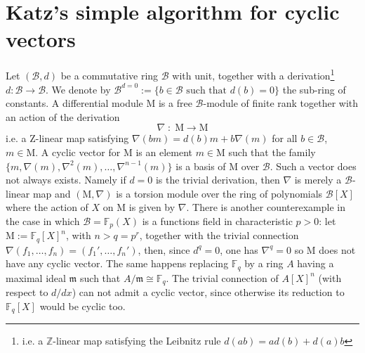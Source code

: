 \documentclass{compositio}
\numberwithin{equation}{section}
\begin{document}
\section{Katz's simple algorithm for cyclic vectors}
Let $({\mathscr{B}},d)$ be a commutative ring ${\mathscr{B}}$ with unit, together with a 
derivation\footnote{i.e. a $\mathbb{Z}$-linear map satisfying the Leibnitz rule $d(ab)=ad(b)+d(a)b$} 
$d:{\mathscr{B}}\to{\mathscr{B}}$.
We denote by ${\mathscr{B}}^{d=0}:=\{b\in{\mathscr{B}}\textrm{ such that }d(b)=0\}$ the sub-ring of constants.
A differential module ${\mathrm{M}}$ is a free ${\mathscr{B}}$-module of finite rank together with an action of the derivation 
\begin{equation}
\nabla\;:\;{\mathrm{M}}\to{\mathrm{M}}
\end{equation}
i.e. a $\mathrm{Z}$-linear map satisfying $\nabla(bm)=d(b)m+b\nabla(m)$ for all $b\in{\mathscr{B}}$, $m\in{\mathrm{M}}$. 
A cyclic vector for ${\mathrm{M}}$ is an element $m\in{\mathrm{M}}$ such that the family 
$\{ m,\nabla(m),\nabla^2(m),\ldots,\nabla^{n-1}(m)\}$ is a basis of ${\mathrm{M}}$ over ${\mathscr{B}}$. Such a vector does not always 
exists. Namely if $d=0$ is the trivial derivation, then $\nabla$ is merely a ${\mathscr{B}}$-linear map and $({\mathrm{M}},\nabla)$ is a 
torsion module over the ring of polynomials ${\mathscr{B}}[X]$ where the action of $X$ on ${\mathrm{M}}$ is given by $\nabla$. 
There is another counterexample in the case in which ${\mathscr{B}}=\mathbb{F}_p(X)$ is a
functions field in characteristic $p>0$: let ${\mathrm{M}}:=\mathbb{F}_q[X]^n$, with $n>q=p^r$, 
together with the trivial connection 
$\nabla(f_1,\ldots,f_n)=(f_1',\ldots,f_n')$, then, since $d^q=0$, one has $\nabla^q=0$ so ${\mathrm{M}}$ does not 
have any cyclic vector. The same happens replacing $\mathbb{F}_q$ by a ring $A$ having a maximal ideal $\mathfrak{m}$ 
such that $A/\mathfrak{m}\cong\mathbb{F}_q$. The trivial connection of $A[X]^n$ (with respect to $d/dx$) 
can not admit a cyclic vector, since otherwise its reduction to $\mathbb{F}_q[X]$ would be cyclic too.
\end{document}

